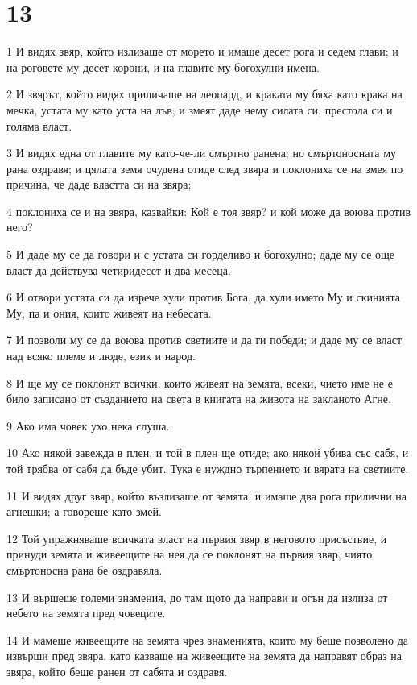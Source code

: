 \chapter{13}

\par 1 И видях звяр, който излизаше от морето и имаше десет рога и седем глави; и на роговете му десет корони, и на главите му богохулни имена.
\par 2 И звярът, който видях приличаше на леопард, и краката му бяха като крака на мечка, устата му като уста на лъв; и змеят даде нему силата си, престола си и голяма власт.
\par 3 И видях една от главите му като-че-ли смъртно ранена; но смъртоносната му рана оздравя; и цялата земя очудена отиде след звяра и поклониха се на змея по причина, че даде властта си на звяра;
\par 4 поклониха се и на звяра, казвайки: Кой е тоя звяр? и кой може да воюва против него?
\par 5 И даде му се да говори и с устата си горделиво и богохулно; даде му се още власт да действува четиридесет и два месеца.
\par 6 И отвори устата си да изрече хули против Бога, да хули името Му и скинията Му, па и ония, които живеят на небесата.
\par 7 И позволи му се да воюва против светиите и да ги победи; и даде му се власт над всяко племе и люде, език и народ.
\par 8 И ще му се поклонят всички, които живеят на земята, всеки, чието име не е било записано от създанието на света в книгата на живота на закланото Агне.
\par 9 Ако има човек ухо нека слуша.
\par 10 Ако някой завежда в плен, и той в плен ще отиде; ако някой убива със сабя, и той трябва от сабя да бъде убит. Тука е нуждно търпението и вярата на светиите.
\par 11 И видях друг звяр, който възлизаше от земята; и имаше два рога прилични на агнешки; а говореше като змей.
\par 12 Той упражняваше всичката власт на първия звяр в неговото присъствие, и принуди земята и живеещите на нея да се поклонят на първия звяр, чиято смъртоносна рана бе оздравяла.
\par 13 И вършеше големи знамения, до там щото да направи и огън да излиза от небето на земята пред човеците.
\par 14 И мамеше живеещите на земята чрез знаменията, които му беше позволено да извърши пред звяра, като казваше на живеещите на земята да направят образ на звяра, който беше ранен от сабята и оздравя.
